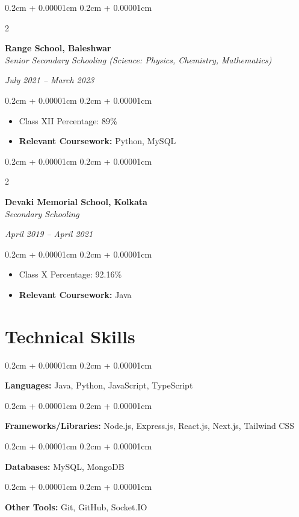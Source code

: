 \documentclass[10pt, letterpaper]{article}
\newenvironment{highlights}{
    \begin{itemize}[
        topsep=0.10cm,
        parsep=0.10cm,
        partopsep=0pt,
        itemsep=0pt,
        leftmargin=0.4cm + 10pt
    ]
}{
    \end{itemize}
}
\newenvironment{onecolentry}{
    \begin{adjustwidth}{
        0.2cm + 0.00001cm
    }{
        0.2cm + 0.00001cm
    }
}{
    \end{adjustwidth}
}
\newenvironment{twocolentry}[2][]{
    \onecolentry
    \def\secondColumn{#2}
    \setcolumnwidth{\fill, 4.5cm}
    \begin{paracol}{2}
}{
    \switchcolumn \raggedleft \secondColumn
    \end{paracol}
    \endonecolentry
}
\begin{document}
    \begin{twocolentry}{
        \textit{July 2021 -- March 2023}
    }
        \textbf{Range School, Baleshwar}\\
        \textit{Senior Secondary Schooling (Science: Physics, Chemistry, Mathematics)}
    \end{twocolentry}

    \vspace{0.10cm}
    \begin{onecolentry}
        \begin{highlights}
            \item Class XII Percentage: 89\%
            \item \textbf{Relevant Coursework:} Python, MySQL
        \end{highlights}
    \end{onecolentry}

    \begin{twocolentry}{
        \textit{April 2019 -- April 2021}
    }
        \textbf{Devaki Memorial School, Kolkata}\\
        \textit{Secondary Schooling}
    \end{twocolentry}

    \vspace{0.10cm}
    \begin{onecolentry}
        \begin{highlights}
            \item Class X Percentage: 92.16\%
            \item \textbf{Relevant Coursework:} Java
        \end{highlights}
    \end{onecolentry}

    \section{Technical Skills}
    \begin{onecolentry}
        \textbf{Languages:} Java, Python, JavaScript, TypeScript \end{onecolentry}
    \begin{onecolentry}
        \textbf{Frameworks/Libraries:} Node.js, Express.js, React.js, Next.js, Tailwind CSS \end{onecolentry}
    \begin{onecolentry}
        \textbf{Databases:} MySQL, MongoDB \end{onecolentry}
    \begin{onecolentry}
        \textbf{Other Tools:} Git, GitHub, Socket.IO \end{onecolentry}
\end{document}
